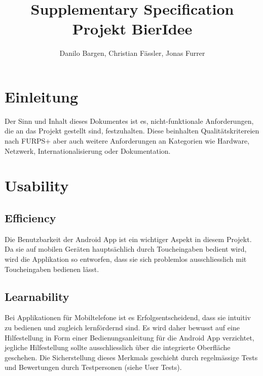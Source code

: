 \documentclass[10pt,a4paper]{scrartcl}
\author{Danilo Bargen, Christian Fässler, Jonas Furrer}
\title{Supplementary Specification \\Projekt BierIdee}
\subtitle{}
\begin{document}
\begin{titlepage}
	\maketitle
	\vspace{120mm}
	\thispagestyle{empty} %
\end{titlepage}


\newpage
	\tableofcontents

	
	
\newpage


\section{Einleitung}

Der Sinn und Inhalt dieses Dokumentes ist es, nicht-funktionale Anforderungen, die an das Projekt gestellt sind, festzuhalten. Diese beinhalten Qualitätskritereien nach FURPS+ aber auch weitere Anforderungen an Kategorien wie Hardware, Netzwerk, Internationalisierung oder Dokumentation.

\section{Usability}

	\subsection{Efficiency}

	Die Benutzbarkeit der Android App ist ein wichtiger Aspekt in diesem Projekt. Da sie auf mobilen Geräten hauptsächlich durch Toucheingaben bedient wird, wird die Applikation so entworfen, dass sie sich problemlos ausschliesslich mit Toucheingaben bedienen lässt.

	\subsection{Learnability}

	Bei Applikationen für Mobiltelefone ist es Erfolgsentscheidend, dass sie intuitiv zu bedienen und zugleich lernfördernd sind. Es wird daher bewusst auf eine Hilfestellung in Form einer Bedienungsanleitung für die Android App verzichtet, jegliche Hilfestellung sollte ausschliesslich über die integrierte Oberfläche geschehen. Die Sicherstellung dieses Merkmals geschieht durch regelmässige Tests und Bewertungen durch Testpersonen (siehe User Tests).
\end{document}
